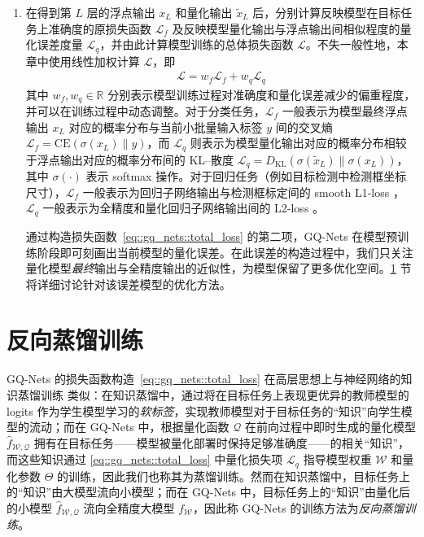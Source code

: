 \documentclass[
  fontset = mac,
]{shtthesis}
\providecommand{\CE}[2]{\mathrm{CE}\left( #1 \| #2 \right)}
\providecommand{\KL}[2]{D_{\mathrm{KL}}\left( #1 \| #2 \right)}
\providecommand{\FpNet}{f_{\mathcal{W}}}
\providecommand{\QuantNet}{\hat{f}_{\mathcal{W, Q}}}
\begin{document}
\begin{enumerate}[1.]
  \item 在得到第 $L$ 层的浮点输出 $x_L$ 和量化输出 $\tilde{x}_L$ 后，分别计算反映模型在目标任务上准确度的原损失函数 $\mathcal{L}_f$ 及反映模型量化输出与浮点输出间相似程度的量化误差度量 $\mathcal{L}_q$，并由此计算模型训练的总体损失函数 $\mathcal{L}$。不失一般性地，本章中使用线性加权计算 $\mathcal{L}$，即
  \begin{align}
    \mathcal{L} = w_f \mathcal{L}_f + w_q \mathcal{L}_q \label{eq::gq_nets::total_loss}
  \end{align}
  其中 $w_f, w_q \in \mathbb{R}$ 分别表示模型训练过程对准确度和量化误差减少的偏重程度，并可以在训练过程中动态调整。对于分类任务，$\mathcal{L}_f$ 一般表示为模型最终浮点输出 $x_L$ 对应的概率分布与当前小批量输入标签 $y$ 间的交叉熵 $\mathcal{L}_f = \CE{\sigma(x_L)}{y}$，而 $\mathcal{L}_q$ 则表示为模型量化输出对应的概率分布相较于浮点输出对应的概率分布间的 KL--散度 $\mathcal{L}_q = \KL{\sigma(\tilde{x}_L)}{\sigma(x_L)}$，其中 $\sigma(\cdot)$ 表示 softmax 操作。对于回归任务（例如目标检测中检测框坐标尺寸），$\mathcal{L}_f$ 一般表示为回归子网络输出与检测框标定间的 smooth L1-loss ， $\mathcal{L}_q$ 一般表示为全精度和量化回归子网络输出间的 L2-loss 。
  
  通过构造损失函数~\eqref{eq::gq_nets::total_loss} 的第二项，GQ-Nets 在模型预训练阶段即可刻画出当前模型的量化误差。在此误差的构造过程中，我们只关注量化模型\emph{最终}输出与全精度输出的近似性，为模型保留了更多优化空间。\ref{sec::gq_nets::train} 节将详细讨论针对该误差模型的优化方法。
\end{enumerate}
\section{反向蒸馏训练} \label{sec::gq_nets::train}
GQ-Nets 的损失函数构造~\eqref{eq::gq_nets::total_loss} 在高层思想上与神经网络的知识蒸馏训练 \citep{hinton2015distilling} 类似：在知识蒸馏中，通过将在目标任务上表现更优异的教师模型的 logits 作为学生模型学习的\emph{软标签}，实现教师模型对于目标任务的“知识”向学生模型的流动；而在 GQ-Nets 中，根据量化函数 $\mathcal{Q}$ 在前向过程中即时生成的量化模型 $\QuantNet$ 拥有在目标任务——模型被量化部署时保持足够准确度——的相关“知识”，而这些知识通过 \eqref{eq::gq_nets::total_loss} 中量化损失项 $\mathcal{L}_q$ 指导模型权重 $\mathcal{W}$ 和量化参数 $\Theta$ 的训练，因此我们也称其为蒸馏训练。然而在知识蒸馏中，目标任务上的“知识”由大模型流向小模型；而在 GQ-Nets 中，目标任务上的“知识”由量化后的小模型 $\QuantNet$ 流向全精度大模型 $\FpNet$，因此称 GQ-Nets 的训练方法为\emph{反向蒸馏训练}。
\end{document}
